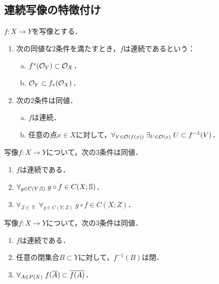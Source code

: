 \documentclass[uplatex,dvipdfmx]{jsreport}
\begin{document}
\subsection{連続写像の特徴付け}

\begin{proposition}
    $f:X\to Y$を写像とする．
    \begin{enumerate}
        \item 次の同値な2条件を満たすとき，$f$は連続であるという：
        \begin{enumerate}[(a)]
            \item $f^*(\mathcal{O}_Y)\subset\mathcal{O}_X$．
            \item $\mathcal{O}_Y\subset f_*(\mathcal{O}_X)$．
        \end{enumerate}
        \item 次の2条件は同値．
        \begin{enumerate}[(a)]
            \item $f$は連続．
            \item 任意の点$x\in X$に対して，$\forall_{V\in\mathcal{O}(f(x))}\;\exists_{U\in\mathcal{O}(x)}\;U\subset f^{-1}(V)$．
        \end{enumerate}
    \end{enumerate}
\end{proposition}

\begin{theorem}[圏論的特徴付け]
    写像$f:X\to Y$について，次の3条件は同値．
    \begin{enumerate}
        \item $f$は連続である．
        \item $\forall_{g\in C(Y;\mathbb{S})}\;g\circ f\in C(X;\mathbb{S})$．
        \item $\forall_{Z\in\Top}\;\forall_{g\in C(Y;Z)}\;g\circ f\in C(X;Z)$．
    \end{enumerate}
\end{theorem}

\begin{proposition}[閉集合と閉包による特徴付け]
    写像$f:X\to Y$について，次の3条件は同値．
    \begin{enumerate}
        \item $f$は連続である．
        \item 任意の閉集合$B\subset Y$に対して，$f^{-1}(B)$は閉．
        \item $\forall_{A\in P(X)}\;f(\overline{A})\subset\overline{f(A)}$．
    \end{enumerate}
\end{proposition}
\end{document}
